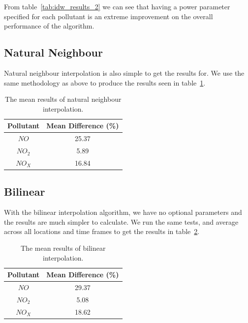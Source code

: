 			From table~\ref{tab:idw_results_2} we can see that having a power parameter specified for each pollutant is an extreme improvement on the overall performance of the algorithm. 

		\subsection{Natural Neighbour}\label{prediction_evaluation_results_natural_neighbour}


        	Natural neighbour interpolation is also simple to get the results for. We use the same methodology as above to produce the results seen in table~\ref{tab:natural_neighbour_results}.

        	\begin{table}
				\centering
	    		\begin{tabular}{|c|c|}
	    			\hline
					Pollutant & Mean Difference (\%) \\ \hline
					$NO$ & 25.37 \\
					$NO_{2}$ & 5.89 \\
					$NO_{X}$ & 16.84 \\
					\hline
				\end{tabular}
				\caption{The mean results of natural neighbour interpolation.}
				\label{tab:natural_neighbour_results}
			\end{table} 

        \subsection{Bilinear}\label{prediction_evaluation_results_bilinear}


        	With the bilinear interpolation algorithm, we have no optional parameters and the results are much simpler to calculate. We run the same tests, and average across all locations and time frames to get the results in table~\ref{tab:bilinear_results}.

        	\begin{table}
				\centering
	    		\begin{tabular}{|c|c|}
	    			\hline
					Pollutant & Mean Difference (\%) \\ \hline
					$NO$ & 29.37 \\
					$NO_{2}$ & 5.08 \\
					$NO_{X}$ & 18.62 \\
					\hline
				\end{tabular}
				\caption{The mean results of bilinear interpolation.}
				\label{tab:bilinear_results}
			\end{table} 

